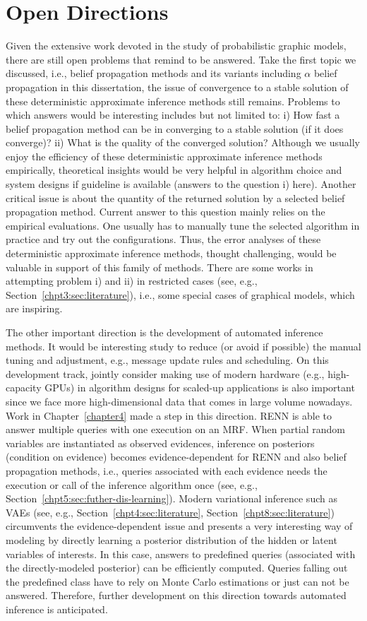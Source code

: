 \section{Open Directions}
Given the extensive work devoted in the study of probabilistic graphic models, there are still open problems that remind to be answered. Take the first topic we discussed, i.e., belief propagation methods and its variants including $\alpha$ belief propagation in this dissertation, the issue of convergence to a stable solution of these deterministic approximate inference methods still remains. Problems to which answers would be interesting includes but not limited to: i) How fast a belief propagation method can be in converging to a stable solution (if it does converge)? ii) What is the quality of the converged solution? Although we usually enjoy the efficiency of these deterministic approximate inference methods empirically, theoretical insights would be very helpful in algorithm choice and system designs if guideline is available (answers to the question i) here). Another critical issue is about the quantity of the returned solution by a selected belief propagation method. Current answer to this question mainly relies on the empirical evaluations. One usually has to manually tune the selected algorithm in practice and try out the configurations. Thus, the error analyses of these deterministic approximate inference methods, thought challenging, would be valuable in support of this family of methods. There are some works in attempting problem i) and ii) in restricted cases (see, e.g., Section~\ref{chpt3:sec:literature}), i.e., some special cases of graphical models, which are inspiring. 

The other important direction is the development of automated inference methods. It would be interesting study to reduce (or avoid if possible) the manual tuning and adjustment, e.g., message update rules and scheduling. On this development track, jointly consider making use of modern hardware (e.g., high-capacity GPUs) in algorithm designs for scaled-up applications is also important since we face more high-dimensional data that comes in large volume nowadays. Work in Chapter~\ref{chapter4} made a step in this direction. RENN is able to answer multiple queries with one execution on an MRF. When partial random variables are instantiated as observed evidences, inference on posteriors (condition on evidence) becomes evidence-dependent for RENN and also belief propagation methods, i.e., queries associated with each evidence needs the execution or call of the inference algorithm once (see, e.g., Section~\ref{chpt5:sec:futher-dis-learning}). Modern variational inference such as VAEs (see, e.g., Section~\ref{chpt4:sec:literature}, Section~\ref{chpt8:sec:literature}) circumvents the evidence-dependent issue and presents a very interesting way of modeling by directly learning a posterior distribution of the hidden or latent variables of interests. In this case, answers to predefined queries (associated with the directly-modeled posterior) can be efficiently computed. Queries falling out the predefined class have to rely on Monte Carlo estimations or just can not be answered. Therefore, further development on this direction towards automated inference is anticipated.


